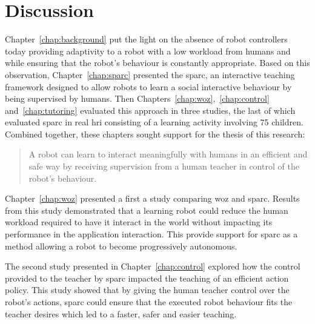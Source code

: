 \chapter{Discussion} \label{chap:discussion}
\glsresetall

Chapter~\ref{chap:background} put the light on the absence of robot controllers today providing adaptivity to a robot with a low workload from humans and while ensuring that the robot's behaviour is constantly appropriate. Based on this observation, Chapter~\ref{chap:sparc} presented the \gls{sparc}, an interactive teaching framework designed to allow robots to learn a social interactive behaviour by being supervised by humans. Then Chapters~\ref{chap:woz},~\ref{chap:control} and~\ref{chap:tutoring} evaluated this approach in three studies, the last of which evaluated \gls{sparc} in real \gls{hri} consisting of a learning activity involving 75 children. Combined together, these chapters sought support for the thesis of this research:

\begin{quote}
	A robot can learn to interact meaningfully with humans in an efficient and safe way by receiving supervision from a human teacher in control of the robot's behaviour.
\end{quote}

Chapter~\ref{chap:woz} presented a first a study comparing \gls{woz} and \gls{sparc}. Results from this study demonstrated that a learning robot could reduce the human workload required to have it interact in the world without impacting its performance in the application interaction. This provide support for \gls{sparc} as a method allowing a robot to become progressively autonomous. 

The second study presented in Chapter~\ref{chap:control} explored how the control provided to the teacher by \gls{sparc} impacted the teaching of an efficient action policy. This study showed that by giving the human teacher control over the robot's actions, \gls{sparc} could ensure that the executed robot behaviour fits the teacher desires which led to a faster, safer and easier teaching. 

